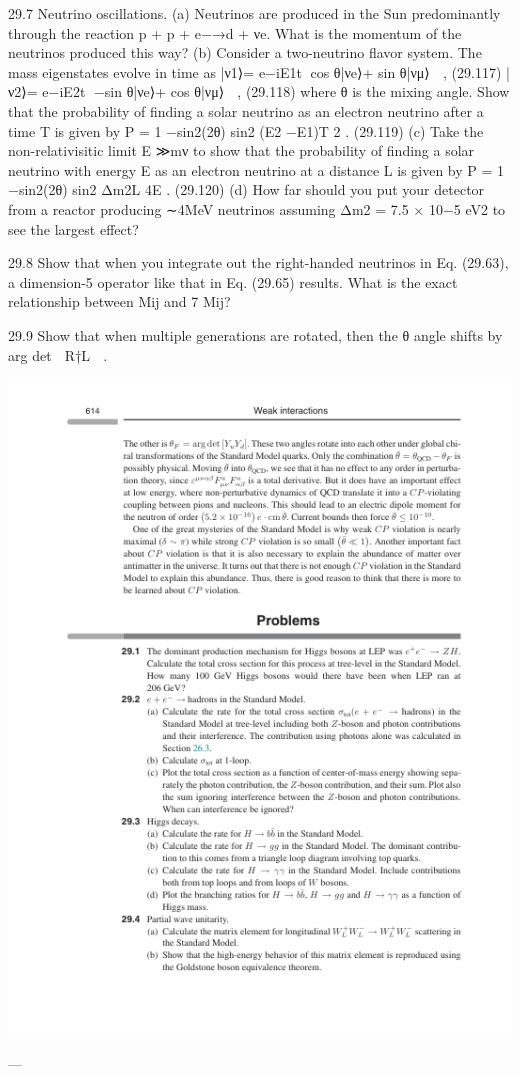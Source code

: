 29.7 Neutrino oscillations.
(a) Neutrinos are produced in the Sun predominantly through the reaction p + p +
e−→d + νe. What is the momentum of the neutrinos produced this way?
(b) Consider a two-neutrino ﬂavor system. The mass eigenstates evolve in time as
|ν1⟩= e−iE1t
cos θ|νe⟩+ sin θ|νμ⟩

,
(29.117)
|ν2⟩= e−iE2t
−sin θ|νe⟩+ cos θ|νμ⟩

,
(29.118)
where θ is the mixing angle. Show that the probability of ﬁnding a solar neutrino
as an electron neutrino after a time T is given by
P = 1 −sin2(2θ) sin2 (E2 −E1)T
2
.
(29.119)
(c) Take the non-relativisitic limit E ≫mν to show that the probability of ﬁnding a
solar neutrino with energy E as an electron neutrino at a distance L is given by
P = 1 −sin2(2θ) sin2 Δm2L
4E
.
(29.120)
(d) How far should you put your detector from a reactor producing ∼4MeV
neutrinos assuming Δm2 = 7.5 × 10−5 eV2 to see the largest effect?

29.8 Show that when you integrate out the right-handed neutrinos in Eq. (29.63), a
dimension-5 operator like that in Eq. (29.65) results. What is the exact relationship
between Mij and 7
Mij?

29.9 Show that when multiple generations are rotated, then the θ angle shifts by
arg det

R†L

.

\includegraphics{./figs/29_Weak_interactions_page_634.png}

---

